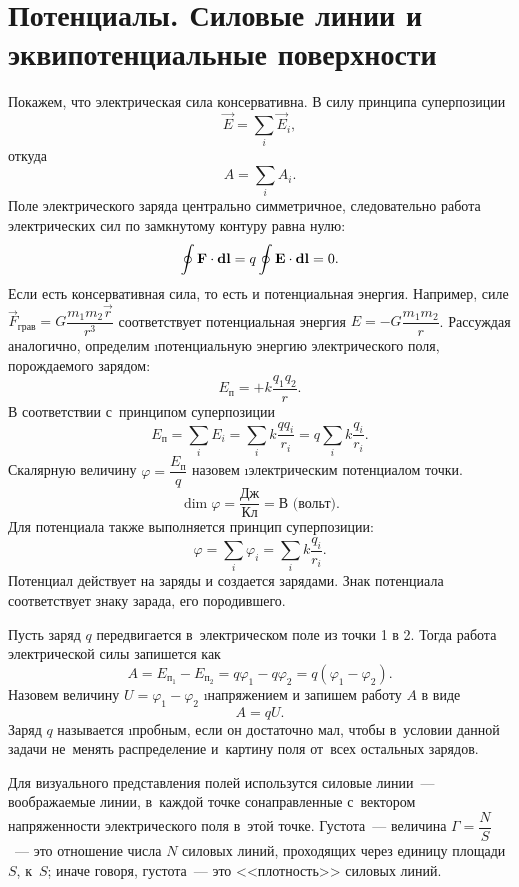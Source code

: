 \section{Потенциалы. Силовые линии и эквипотенциальные поверхности}

	Покажем, что электрическая сила консервативна. В силу принципа суперпозиции
		$$\vec{E}=\sum_i \vec{E}_i,$$
	откуда
		$$A=\sum_i A_i.$$
	Поле электрического заряда центрально симметричное, следовательно работа электрических сил по замкнутому контуру равна нулю:
		$$\oint \text{\textbf{F}}\cdot\textbf{d}\text{\textbf{l}}=q\oint \text{\textbf{E}}\cdot\textbf{d}\text{\textbf{l}}=0.$$
	Если есть консервативная сила, то есть и потенциальная энергия. Например, силе $\vec{F}_{\text{грав}}=G\dfrac{m_1m_2\vec{r}}{r^3}$ соответствует потенциальная энергия $E=-G\dfrac{m_1m_2}{r}$. Рассуждая аналогично, определим \i{потенциальную энергию электрического поля, порождаемого зарядом}:
		$$E_{\text{п}}=+k\frac{q_1q_2}{r}.$$
	В соответствии с~принципом суперпозиции
		$$E_{\text{п}}=\sum_i E_i=\sum_i k\frac{qq_i}{r_i}=q\sum_i k\frac{q_i}{r_i}.$$
	Скалярную величину $\varphi=\dfrac{E_{\text{п}}}{q}$ назовем \i{электрическим потенциалом точки}.
		$$\dim{\varphi}=\frac{\text{Дж}}{\text{Кл}}=\text{В (вольт)}.$$
	Для потенциала также выполняется принцип суперпозиции:
		$$\varphi=\sum_i \varphi_i=\sum_i k\frac{q_i}{r_i}.$$
	Потенциал действует на заряды и создается зарядами. Знак потенциала соответствует знаку зарада, его породившего. \par
	Пусть заряд $q$ передвигается в~электрическом поле из точки 1 в 2. Тогда работа электрической силы запишется как
		$$A=E_{\text{п}_{\text{1}}}-E_{\text{п}_{\text{2}}}=q\varphi_1-q\varphi_2=q(\varphi_1-\varphi_2).$$
	Назовем величину $U=\varphi_1-\varphi_2$ \i{напряжением} и запишем работу $A$ в виде 
		$$A=qU.$$
	Заряд $q$ называется \i{пробным}, если он достаточно мал, чтобы в~условии данной задачи не~менять распределение и~картину поля от~всех остальных зарядов.\par
	Для визуального представления полей использутся силовые линии~--- воображаемые линии, в~каждой точке сонаправленные с~вектором напряженности электрического поля в~этой точке. Густота~--- величина $\Gamma=\dfrac{N}{S}$~--- это отношение числа $N$ силовых линий, проходящих через единицу площади $S$, к~$S$; иначе говоря, густота~--- это <<плотность>> силовых линий.